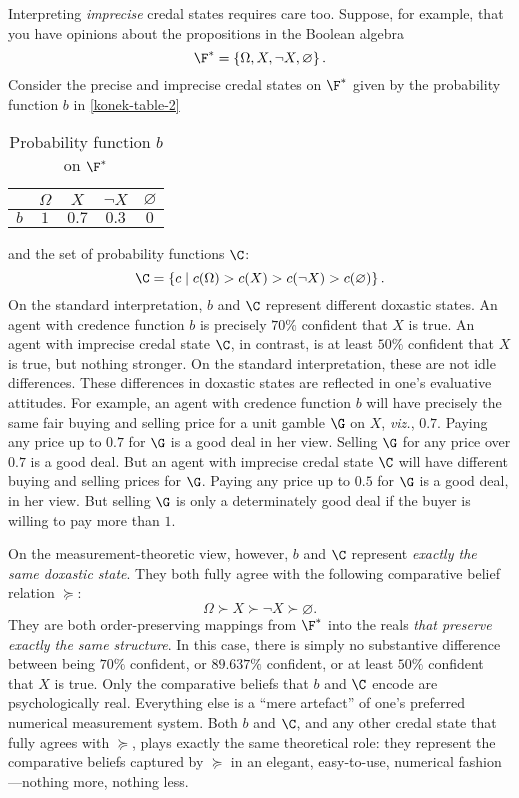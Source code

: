 Interpreting \textit{imprecise} credal states requires care too. Suppose, for example, that you have opinions about the propositions in the Boolean algebra
$$ \F^*=\left\{\Omega, X, \neg X,\varnothing\right\}. $$
Consider the precise and imprecise credal states on $\F^*$ given by the probability function $b$ in \autoref{konek-table-2}
\begin{table}[ht]
\centering
\begin{tabular}{ccccc}
\hline
& $\Omega$&$X$&$\neg X$&$\varnothing$\\
\hline\hline
$b$ & $1$ & $0.7$ & $0.3$ & $0$\\
\hline
\end{tabular}
\caption{Probability function $b$ on $\F^*$}\label{konek-table-2}
\end{table}
and the set of probability functions $\C$:
$$ \C=\left\{c \mathrel{|} c(\Omega)>c(X)>c(\neg X)>c(\varnothing)\right\}. $$
On the standard interpretation, $b$ and $\C$ represent different doxastic states. An agent with credence function $b$ is precisely $70\%$ confident that $X$ is true. An agent with imprecise credal state $\C$, in contrast, is at least $50\%$ confident that $X$ is true, but nothing stronger. On the standard interpretation, these are not idle differences. These differences in doxastic states are reflected in one's evaluative attitudes. For example, an agent with credence function $b$ will have precisely the same fair buying and selling price for a unit gamble $\G$ on $X$, \textit{viz.}, $0.7$. Paying any price up to \textsterling$0.7$ for $\G$ is a good deal in her view. Selling $\G$ for any price over \textsterling$0.7$ is a good deal. But an agent with imprecise credal state $\C$ will have different buying and selling prices for $\G$. Paying any price up to \textsterling$0.5$ for $\G$ is a good deal, in her view. But selling $\G$ is only a determinately good deal if the buyer is willing to pay more than \textsterling$1$.

On the measurement-theoretic view, however, $b$ and $\C$ represent \textit{exactly the same doxastic state}. They both fully agree with the following comparative belief relation $\succeq$:
$$ \Omega\succ X\succ \neg X\succ\varnothing. $$
They are both order-preserving mappings from $\F^*$ into the reals \textit{that preserve exactly the same structure}. In this case, there is simply no substantive difference between being $70\%$ confident, or $89.637\%$ confident, or at least $50\%$ confident that $X$ is true. Only the comparative beliefs that $b$ and $\C$ encode are psychologically real. Everything else is a ``mere artefact'' of one's preferred numerical measurement system. Both $b$ and $\C$, and any other credal state that fully agrees with $\succeq$, plays exactly the same theoretical role: they represent the comparative beliefs captured by $\succeq$ in an elegant, easy-to-use, numerical fashion---nothing more, nothing less.



